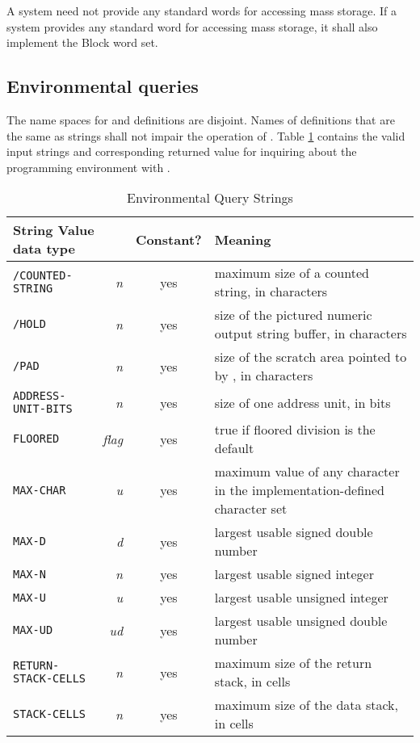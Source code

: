 A system need not provide any standard words for accessing mass
storage. If a system provides any standard word for accessing
mass storage, it shall also implement the Block word set.

\subsection{Environmental queries} %
\label{usage:env}

The name spaces for  and definitions are
disjoint. Names of definitions that are the same as
 strings shall not impair the operation of
. Table \ref{table:env} contains
the valid input strings and corresponding returned value for
inquiring about the programming environment with
.

\begin{table}[ht]
  \begin{center}
	\caption{Environmental Query Strings}
	\label{table:env}
	\begin{tabular}{p{11em}rcp{}}
		\hline\hline
		\multicolumn{2}{l}{String \hfill Value data type} & Constant? & Meaning \\
		\hline
		\texttt{/COUNTED-STRING}	& \emph{n}		& yes
				& maximum size of a counted string, in characters \\
		\texttt{/HOLD}					& \emph{n}		& yes
				& size of the pictured numeric output string buffer,
				  in characters \\
		\texttt{/PAD}					& \emph{n}		& yes
				& size of the scratch area pointed to by \word{PAD},
				  in characters \\
		\texttt{ADDRESS-UNIT-BITS}	& \emph{n}		& yes
				& size of one address unit, in bits \\
		\texttt{FLOORED}				& \emph{flag}	& yes
				& 	true if floored division is the default \\
		\texttt{MAX-CHAR}				& \emph{u}		& yes
				& maximum value of any character in the
				  implementation-defined character set \\
		\texttt{MAX-D}					& \emph{d}		& yes
				& largest usable signed double number \\
		\texttt{MAX-N}					& \emph{n}		& yes
				& largest usable signed integer \\
		\texttt{MAX-U}					& \emph{u}		& yes
				& largest usable unsigned integer \\
		\texttt{MAX-UD}				& \emph{ud}		& yes
				& largest usable unsigned double number \\
		\texttt{RETURN-STACK-CELLS}	& \emph{n}		& yes
				& maximum size of the return stack, in cells \\
		\texttt{STACK-CELLS}			& \emph{n}		& yes
				& maximum size of the data stack, in cells \\
		\hline\hline
	\end{tabular}
  \end{center}
\end{table}

